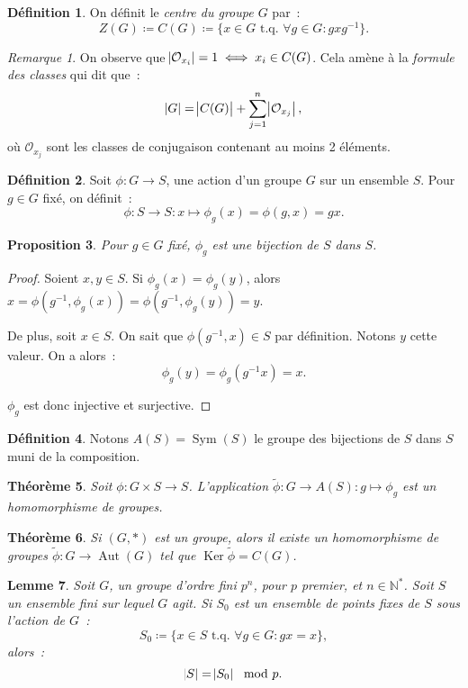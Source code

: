 \documentclass{article}
\newtheorem{thm}{Théorème}[section]
\newtheorem{prp}[thm]{Proposition}
\newtheorem{lem}[thm]{Lemme}
\theoremstyle{definition}
\newtheorem{déf}[thm]{Définition}
\theoremstyle{remark}
\newtheorem*{rmq}{Remarque}
\DeclareMathOperator{\Ker}{Ker}
\DeclareMathOperator{\Aut}{Aut}
\DeclareMathOperator{\Sym}{Sym}
\newcommand{\N}{\mathbb N}
\newcommand{\tq}{\text{ t.q. }}
\begin{document}
	\begin{déf} On définit le \textit{centre du groupe $G$} par~:
	\[Z(G) \coloneqq C(G) \coloneqq \{x \in G \tq \forall g \in G : gxg^{-1}\}.\]
	\end{déf}

	\begin{rmq} On observe que $\abs {\mathcal O_{x_i}} = 1 \iff x_i \in C(G)$. Cela amène à la \textit{formule des classes} qui dit que~:
	\[\abs G = \abs {C(G)} + \sum_{j=1}^n\abs {\mathcal O_{x_j}},\]
	où $\mathcal O_{x_j}$ sont les classes de conjugaison contenant au moins 2 éléments.
	\end{rmq}

	\begin{déf} Soit $\phi : G \to S$, une action d'un groupe $G$ sur un ensemble $S$. Pour $g \in G$ fixé, on définit~:
	\[\phi : S \to S : x \mapsto \phi_g(x) = \phi(g, x) = gx.\]
	\end{déf}

	\begin{prp} Pour $g \in G$ fixé, $\phi_g$ est une bijection de $S$ dans $S$.
	\end{prp}

	\begin{proof} Soient $x, y \in S$. Si $\phi_g(x) = \phi_g(y)$, alors $x = \phi(g^{-1}, \phi_g(x)) = \phi(g^{-1}, \phi_g(y)) = y$.

	De plus, soit $x \in S$. On sait que $\phi(g^{-1}, x) \in S$ par définition. Notons $y$ cette valeur. On a alors~:
	\[\phi_g(y) = \phi_g(g^{-1}x) = x.\]

	$\phi_g$ est donc injective et surjective.
	\end{proof}

	\begin{déf} Notons $A(S) = \Sym(S)$ le groupe des bijections de $S$ dans $S$ muni de la composition.
	\end{déf}

	\begin{thm} Soit $\phi : G \times S \to S$. L'application $\widetilde \phi : G \to A(S) : g \mapsto \phi_g$ est un homomorphisme de groupes.
	\end{thm}

	\begin{thm} Si $(G, *)$ est un groupe, alors il existe un homomorphisme de groupes $\widetilde \phi : G \to \Aut(G)$ tel que $\Ker \widetilde \phi = C(G)$.
	\end{thm}

	\begin{lem}\label{lem:|S|=|S_0|} Soit $G$, un groupe d'ordre fini $p^n$, pour $p$ premier, et $n \in \N^*$. Soit $S$ un ensemble fini sur lequel $G$ agit.
	Si $S_0$ est un ensemble de points fixes de $S$ sous l'action de $G$~:
	\[S_0 \coloneqq \{x \in S \tq \forall g \in G : gx = x\},\]
	alors~:
	\[\abs S = \abs {S_0} \mod p.\]
	\end{lem}
\end{document}
